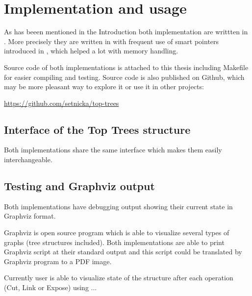 \chapter{Implementation and usage}
\label{chap:Implementation}

As has beeen mentioned in the Introduction both implementation are writtten
in \Cpp. More precisely they are written in  with frequent use of smart
pointers introduced in , which helped a lot with memory handling.

Source code of both implementations is attached to this thesis including
Makefile for easier compiling and testing. Source code is also published on
Github, which may be more pleasant way to explore it or use it in other
projects:

\bigskip
\centerline{\url{https://github.com/setnicka/top-trees}}
\bigskip

\section{Interface of the Top Trees structure}

Both implementations share the same interface which makes them easily
interchangeable.


\section{Testing and Graphviz output}

Both implementations have debugging output showing their current state
in Graphviz format.

Graphviz is open source program which is able to visualize several types of
graphs (tree structures included). Both implementations are able to print
Graphviz script at their standard output and this script could be translated by
Graphviz program to a PDF image.

Currently user is able to visualize state of the structure after each operation
(Cut, Link or Expose) using ... 
